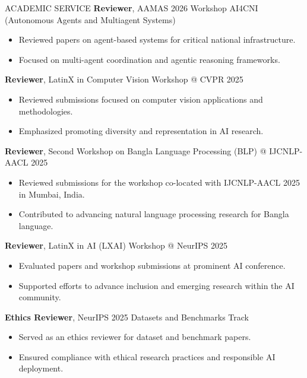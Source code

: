 \documentclass{resume} %
\begin{document}
\begin{rSection}{ACADEMIC SERVICE}
\textbf{Reviewer}, AAMAS 2026 Workshop AI4CNI (Autonomous Agents and Multiagent Systems)
\begin{itemize}
    \item Reviewed papers on agent-based systems for critical national infrastructure.
    \item Focused on multi-agent coordination and agentic reasoning frameworks.
\end{itemize}

\textbf{Reviewer}, LatinX in Computer Vision Workshop @ CVPR 2025
\begin{itemize}
    \item Reviewed submissions focused on computer vision applications and methodologies.
    \item Emphasized promoting diversity and representation in AI research.
\end{itemize}

\textbf{Reviewer}, Second Workshop on Bangla Language Processing (BLP) @ IJCNLP-AACL 2025
\begin{itemize}
    \item Reviewed submissions for the workshop co-located with IJCNLP-AACL 2025 in Mumbai, India.
    \item Contributed to advancing natural language processing research for Bangla language.
\end{itemize}

\textbf{Reviewer}, LatinX in AI (LXAI) Workshop @ NeurIPS 2025
\begin{itemize}
    \item Evaluated papers and workshop submissions at prominent AI conference.
    \item Supported efforts to advance inclusion and emerging research within the AI community.
\end{itemize}

\textbf{Ethics Reviewer}, NeurIPS 2025 Datasets and Benchmarks Track
\begin{itemize}
    \item Served as an ethics reviewer for dataset and benchmark papers.
    \item Ensured compliance with ethical research practices and responsible AI deployment.
\end{itemize}

\end{rSection}
\end{document}
